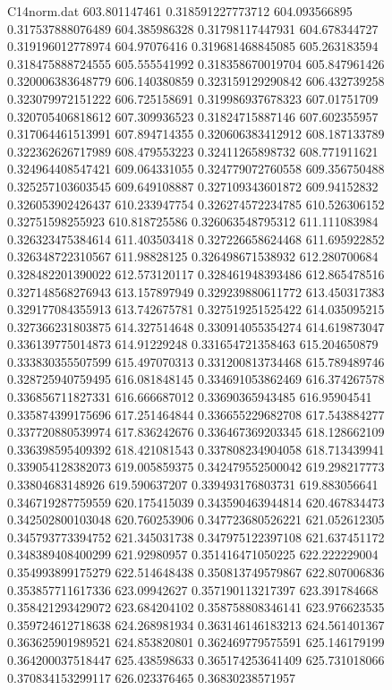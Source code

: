 \begin{filecontents}{C14norm.dat}
603.801147461			0.318591227773712
604.093566895			0.317537888076489
604.385986328			0.31798117447931
604.678344727			0.319196012778974
604.97076416			0.319681468845085
605.263183594			0.318475888724555
605.555541992			0.318358670019704
605.847961426			0.320006383648779
606.140380859			0.323159129290842
606.432739258			0.323079972151222
606.725158691			0.319986937678323
607.01751709			0.320705406818612
607.309936523			0.31824715887146
607.602355957			0.317064461513991
607.894714355			0.320606383412912
608.187133789			0.322362626717989
608.479553223			0.32411265898732
608.771911621			0.324964408547421
609.064331055			0.324779072760558
609.356750488			0.325257103603545
609.649108887			0.327109343601872
609.94152832			0.326053902426437
610.233947754			0.326274572234785
610.526306152			0.32751598255923
610.818725586			0.326063548795312
611.111083984			0.326323475384614
611.403503418			0.327226658624468
611.695922852			0.326348722310567
611.98828125			0.326498671538932
612.280700684			0.328482201390022
612.573120117			0.328461948393486
612.865478516			0.327148568276943
613.157897949			0.329239880611772
613.450317383			0.329177084355913
613.742675781			0.327519251525422
614.035095215			0.327366231803875
614.327514648			0.330914055354274
614.619873047			0.336139775014873
614.91229248			0.331654721358463
615.204650879			0.333830355507599
615.497070313			0.331200813734468
615.789489746			0.328725940759495
616.081848145			0.334691053862469
616.374267578			0.336856711827331
616.666687012			0.33690365943485
616.95904541			0.335874399175696
617.251464844			0.336655229682708
617.543884277			0.337720880539974
617.836242676			0.336467369203345
618.128662109			0.336398595409392
618.421081543			0.337808234904058
618.713439941			0.339054128382073
619.005859375			0.342479552500042
619.298217773			0.33804683148926
619.590637207			0.339493176803731
619.883056641			0.346719287759559
620.175415039			0.343590463944814
620.467834473			0.342502800103048
620.760253906			0.347723680526221
621.052612305			0.345793773394752
621.345031738			0.347975122397108
621.637451172			0.348389408400299
621.92980957			0.351416471050225
622.222229004			0.354993899175279
622.514648438			0.350813749579867
622.807006836			0.353857711617336
623.09942627			0.357190113217397
623.391784668			0.358421293429072
623.684204102			0.358758808346141
623.976623535			0.359724612718638
624.268981934			0.363146146183213
624.561401367			0.363625901989521
624.853820801			0.362469779575591
625.146179199			0.364200037518447
625.438598633			0.365174253641409
625.731018066			0.370834153299117
626.023376465			0.36830238571957

\end{filecontents}
